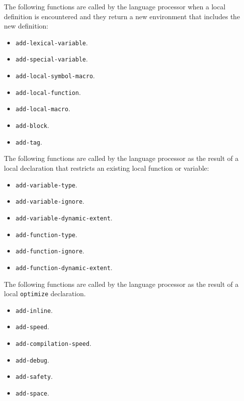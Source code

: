 The following functions are called by the language processor when a
local definition is encountered and they return a new environment that
includes the new definition:

\begin{itemize}
\item \texttt{add-lexical-variable}.
\item \texttt{add-special-variable}.
\item \texttt{add-local-symbol-macro}.
\item \texttt{add-local-function}.
\item \texttt{add-local-macro}.
\item \texttt{add-block}.
\item \texttt{add-tag}.
\end{itemize}

The following functions are called by the language processor as the
result of a local declaration that restricts an existing local
function or variable:

\begin{itemize}
\item \texttt{add-variable-type}.
\item \texttt{add-variable-ignore}.
\item \texttt{add-variable-dynamic-extent}.
\item \texttt{add-function-type}.
\item \texttt{add-function-ignore}.
\item \texttt{add-function-dynamic-extent}.
\end{itemize}

The following functions are called by the language processor as the
result of a local \texttt{optimize} declaration.

\begin{itemize}
\item \texttt{add-inline}.
\item \texttt{add-speed}.
\item \texttt{add-compilation-speed}.
\item \texttt{add-debug}.
\item \texttt{add-safety}.
\item \texttt{add-space}.
\end{itemize}
